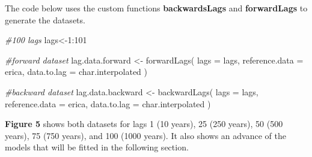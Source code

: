 \documentclass[
]{article}
\newenvironment{Shaded}{\begin{snugshade}}{\end{snugshade}}
\newcommand{\AttributeTok}[1]{\textcolor[rgb]{0.77,0.63,0.00}{#1}}
\newcommand{\CommentTok}[1]{\textcolor[rgb]{0.56,0.35,0.01}{\textit{#1}}}
\newcommand{\DecValTok}[1]{\textcolor[rgb]{0.00,0.00,0.81}{#1}}
\newcommand{\FunctionTok}[1]{\textcolor[rgb]{0.00,0.00,0.00}{#1}}
\newcommand{\NormalTok}[1]{#1}
\newcommand{\OtherTok}[1]{\textcolor[rgb]{0.56,0.35,0.01}{#1}}
\newcommand{\SpecialCharTok}[1]{\textcolor[rgb]{0.00,0.00,0.00}{#1}}
\begin{document}
The code below uses the custom functions \textbf{backwardsLags} and
\textbf{forwardLags} to generate the datasets.

\small

\begin{Shaded}
\begin{Highlighting}[]
\CommentTok{\#100 lags}
\NormalTok{lags}\OtherTok{\textless{}{-}}\DecValTok{1}\SpecialCharTok{:}\DecValTok{101}

\CommentTok{\#forward dataset}
\NormalTok{lag.data.forward }\OtherTok{\textless{}{-}} \FunctionTok{forwardLags}\NormalTok{(}
  \AttributeTok{lags =}\NormalTok{ lags,}
  \AttributeTok{reference.data =}\NormalTok{ erica,}
  \AttributeTok{data.to.lag =}\NormalTok{ char.interpolated}
\NormalTok{  )}

\CommentTok{\#backward dataset}
\NormalTok{lag.data.backward }\OtherTok{\textless{}{-}} \FunctionTok{backwardLags}\NormalTok{(}
  \AttributeTok{lags =}\NormalTok{ lags, }
  \AttributeTok{reference.data =}\NormalTok{ erica, }
  \AttributeTok{data.to.lag =}\NormalTok{ char.interpolated}
\NormalTok{  )}
\end{Highlighting}
\end{Shaded}

\normalsize

\textbf{Figure 5} shows both datasets for lags 1 (10 years), 25 (250
years), 50 (500 years), 75 (750 years), and 100 (1000 years). It also
shows an advance of the models that will be fitted in the following
section.
\end{document}
